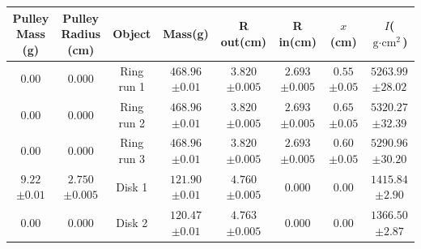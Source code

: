 \begin{center}
  \begin{tabular}{|c|c|c|c|c|c|c|c|}
    \hline
    \makecell{Pulley                                   \\Mass\\(g)}&\makecell{Pulley\\Radius\\(cm)}&Object&Mass(g)&R out(cm)&R in(cm)&$x$(cm)&$I$($\text{g$\cdot$cm}^2$)\\
    \hline
    $0.00$ & $0.000$ & Ring run 1 & \makecell{$468.96$ \\$\pm0.01$}&\makecell{$3.820$\\$\pm0.005$}&\makecell{$2.693$\\$\pm0.005$}&\makecell{$0.55$\\$\pm0.05$}&\makecell{$5263.99$\\$\pm28.02$}\\
    \hline
    $0.00$ & $0.000$ & Ring run 2 & \makecell{$468.96$ \\$\pm0.01$}&\makecell{$3.820$\\$\pm0.005$}&\makecell{$2.693$\\$\pm0.005$}&\makecell{$0.65$\\$\pm0.05$}&\makecell{$5320.27$\\$\pm32.39$}\\
    \hline
    $0.00$ & $0.000$ & Ring run 3 & \makecell{$468.96$ \\$\pm0.01$}&\makecell{$3.820$\\$\pm0.005$}&\makecell{$2.693$\\$\pm0.005$}&\makecell{$0.60$\\$\pm0.05$}&\makecell{$5290.96$\\$\pm30.20$}\\
    \hline
    \makecell{$9.22$                                   \\$\pm0.01$}&\makecell{$2.750$\\$\pm0.005$}&Disk 1&\makecell{$121.90$\\$\pm0.01$}&\makecell{$4.760$\\$\pm0.005$}&$0.000$&$0.00$&\makecell{$1415.84$\\$\pm2.90$}\\
    \hline
    $0.00$ & $0.000$ & Disk 2     & \makecell{$120.47$ \\$\pm0.01$}&\makecell{$4.763$\\$\pm0.005$}&$0.000$&$0.00$&\makecell{$1366.50$\\$\pm2.87$}\\
    \hline
  \end{tabular}
  \label{tab:PhyData}
\end{center}
